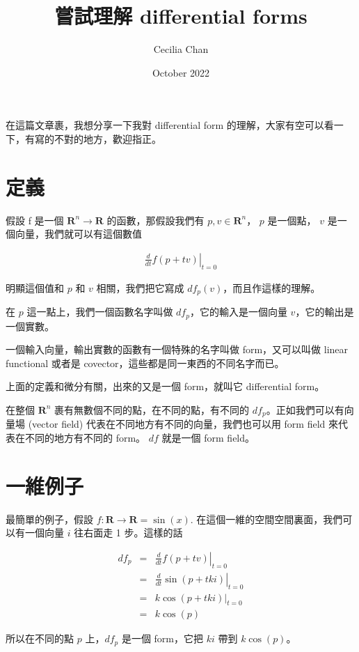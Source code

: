 \documentclass{article}
\title{嘗試理解 differential forms}
\author{Cecilia Chan}
\date{October 2022}
\begin{document}
\maketitle
在這篇文章裹，我想分享一下我對 differential form 的理解，大家有空可以看一下，有寫的不對的地方，歡迎指正。

\section{定義}
假設 f 是一個 $ \mathbf{R}^n \to \mathbf{R} $ 的函數，那假設我們有 $ p, v \in \mathbf{R}^n $， $ p $ 是一個點， $ v $ 是一個向量，我們就可以有這個數值

\begin{eqnarray*}
  \left. \frac{d}{dt} f(p + tv)\right|_{t = 0}
\end{eqnarray*}

明顯這個值和 $ p $ 和 $ v $ 相關，我們把它寫成 $ df_p(v) $，而且作這樣的理解。

在 $ p $ 這一點上，我們一個函數名字叫做 $ df_p $，它的輸入是一個向量 $ v $，它的輸出是一個實數。

一個輸入向量，輸出實數的函數有一個特殊的名字叫做 form，又可以叫做 linear functional 或者是 covector，這些都是同一東西的不同名字而已。

上面的定義和微分有關，出來的又是一個 form，就叫它 differential form。

在整個 $ \mathbf{R}^n $ 裹有無數個不同的點，在不同的點，有不同的 $ df_p $。正如我們可以有向量場 (vector field) 代表在不同地方有不同的向量，我們也可以用 form field 來代表在不同的地方有不同的 form。 $ df $ 就是一個 form field。

\section{一維例子}
最簡單的例子，假設 $ f: \mathbf{R} \to \mathbf{R} = \sin(x) $. 在這個一維的空間空間裏面，我們可以有一個向量 $ i $ 往右面走 1 步。這樣的話

\begin{eqnarray*}
  df_p &=& \left. \frac{d}{dt} f(p + tv)\right|_{t = 0} \\
       &=& \left. \frac{d}{dt} \sin(p + tki)\right|_{t = 0} \\
       &=& \left. k\cos(p + tki)\right|_{t = 0} \\
       &=& k \cos(p)
\end{eqnarray*}

所以在不同的點 $ p $ 上，$ df_p $ 是一個 form，它把 $ ki $ 帶到 $ k \cos(p) $。
\end{document}
